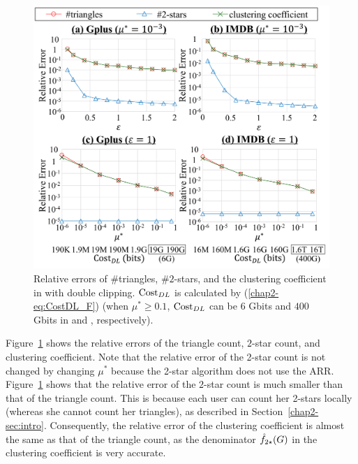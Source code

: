 \begin{figure}[t]
  \centering
  \includegraphics[width=0.99\linewidth]{fig/res5_cluster.pdf}
  
  \caption[Relative errors of \#triangles, \#$2$-stars, and the clustering coefficient in \AlgTwo{} with double clipping.]
	{Relative errors of \#triangles, \#$2$-stars, and the clustering coefficient in \AlgTwo{} with double clipping.
  $\mathrm{Cost}_{DL}$ is calculated by (\ref{chap2-eq:CostDL_F})
  (when $\mu^* \geq 0.1$,
  $\mathrm{Cost}_{DL}$ can be $6$ Gbits and $400$ Gbits in \GPlus{} and \IMDB{}, respectively).
  }
  \label{chap2-fig:res5_cluster}
\end{figure}

Figure~\ref{chap2-fig:res5_cluster} shows the relative errors of the triangle count, $2$-star count, and clustering coefficient.
Note that the relative error of the 2-star count is not changed by changing
$\mu^*$
because the 2-star algorithm does not use the ARR.
Figure~\ref{chap2-fig:res5_cluster} shows that the relative error of the $2$-star count is much smaller than that of the triangle count.
This is because each user can count her 2-stars locally (whereas she cannot count her triangles), as described in Section~\ref{chap2-sec:intro}.
Consequently, the relative error of the clustering coefficient is almost the same as that of the triangle count, as the denominator $\hat{f}_{2\star}(G)$ in the clustering coefficient is very accurate.

